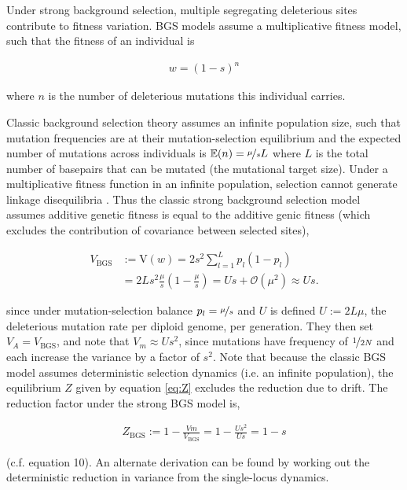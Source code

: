 \documentclass[11pt]{article}
\newcommand{\E}{\mathbb{E}}
\newcommand{\V}{\text{V}}
\begin{document}
Under strong background selection, multiple segregating deleterious sites
contribute to fitness variation. BGS models assume a multiplicative fitness
model, such that the fitness of an individual is

\begin{align}
  w = (1-s)^{n}
\end{align}

where $n$ is the number of deleterious mutations this individual carries.

Classic background selection theory assumes an infinite population size, such
that mutation frequencies are at their mutation-selection equilibrium and the
expected number of mutations across individuals is $\E(n) = \nicefrac{\mu}{s}L$
where $L$ is the total number of basepairs that can be mutated (the mutational
target size).  Under a multiplicative fitness function in an infinite
population, selection cannot generate linkage disequilibria
\parencite{Turelli1990-kd}. Thus the classic strong background selection model
assumes additive genetic fitness is equal to the additive genic fitness (which
excludes the contribution of covariance between selected sites), 

\begin{align}
  \label{eq:va_bgs}
  V_\text{BGS} &:= \V(w) = 2 s^2 \sum_{l=1}^L p_l(1-p_l)  \\
            &= 2 L s^2 \frac{\mu}{s} \left( 1 - \frac{\mu}{s}\right) = U s + \mathcal{O}(\mu^2) \approx Us.
\end{align}

since under mutation-selection balance $p_l = \nicefrac{\mu}{s}$ and $U$ is
defined $U := 2 L \mu$, the deleterious mutation rate per diploid genome, per
generation. They then set $V_A = V_\text{BGS}$, and note that $V_m \approx
Us^2$, since mutations have frequency of $\nicefrac{1}{2N}$ and each increase
the variance by a factor of $s^2$. Note that because the classic BGS model
assumes deterministic selection dynamics (i.e. an infinite population), the
equilibrium $Z$ given by equation \eqref{eq:Z} excludes the reduction due to
drift. The reduction factor under the strong BGS model is,

\begin{align}
  Z_\text{BGS} := 1 - \frac{Vm}{V_\text{BGS}} = 1 - \frac{Us^2}{Us} = 1 - s
\end{align}

(c.f. \cite{Santiago1998-bs} equation 10). An alternate derivation can be found
by working out the deterministic reduction in variance from the single-locus
dynamics. 
\end{document}

